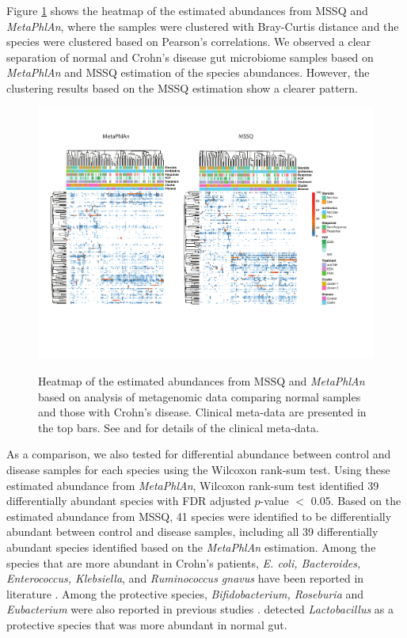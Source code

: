 Figure \ref{F35_2016_02_01_Heatmap_Merge} shows the heatmap of the estimated abundances from MSSQ and {\it MetaPhlAn}, where the samples were clustered with  Bray-Curtis distance and the species were clustered based on Pearson's correlations. We observed a clear separation of normal and Crohn's disease gut microbiome samples based on {\it MetaPhlAn} and MSSQ estimation of the species abundances.  However, the clustering results based on the MSSQ estimation show a clearer pattern. 




\begin{figure}[th]
	\centering
	{\includegraphics[scale=0.6,trim=30 140 0 0,clip]{Figure/F35_2016_02_01_Heatmap_Merge.pdf}
	}
	\caption[Heatmap of the estimated abundances from MSSQ and {\it MetaPhlAn}]{Heatmap of the estimated abundances from MSSQ and {\it MetaPhlAn} based on analysis of metagenomic data comparing normal samples and those with Crohn's disease.  Clinical meta-data are presented in the top bars. See \cite{lewis2015inflammation} and \cite{lee2015comparative} for details of the clinical meta-data. }
	\label{F35_2016_02_01_Heatmap_Merge}
\end{figure}


As a comparison, we also tested for differential abundance between control and disease samples for each species using the Wilcoxon rank-sum test. Using these estimated abundance from {\it MetaPhlAn}, Wilcoxon rank-sum test identified 39 differentially abundant species with  FDR adjusted $p$-value $<$ 0.05. Based on the estimated abundance from MSSQ, 41 species were identified to be differentially abundant between control and disease samples, including all 39 differentially abundant species identified based on the {\it MetaPhlAn} estimation. Among the species that are more abundant in Crohn's patients, {\it E. coli, Bacteroides, Enterococcus, Klebsiella}, and {\it  Ruminococcus gnavus} have been reported in literature \citep{Sartor, Liu95}. Among the protective species, {\it Bifidobacterium, Roseburia} and {\it Eubacterium} were also reported in previous studies \citep{manichanh2012gut}. \cite{manichanh2012gut} detected {\it Lactobacillus} as a protective species that was more abundant in normal gut. 

